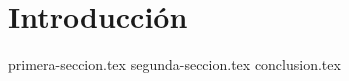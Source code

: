 \documentclass[titlepage,a4paper,12pt]{article}
\begin{document}

\thispagestyle{empty}
\tableofcontents
\clearpage

\setlength{\parskip}{2mm}
\section{Introducción}
{primera-seccion.tex}
{segunda-seccion.tex}
{conclusion.tex}
\clearpage
\printbibliography[heading=bibintoc, title={Trabajos Citados}]
\appendixpage
\begin{appendix}
\end{appendix}
\end{document}

